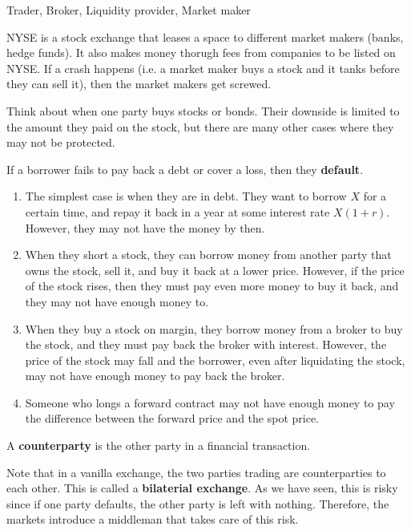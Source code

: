 \documentclass{article}
\begin{document}
    Trader, Broker, Liquidity provider, Market maker 

    NYSE is a stock exchange that leases a space to different market makers (banks, hedge funds). It also makes money thorugh fees from companies to be listed on NYSE. If a crash happens (i.e. a market maker buys a stock and it tanks before they can sell it), then the market makers get screwed. 

    Think about when one party buys stocks or bonds. Their downside is limited to the amount they paid on the stock, but there are many other cases where they may not be protected. 

    \begin{definition}[Default]
      If a borrower fails to pay back a debt or cover a loss, then they \textbf{default}. 
    \end{definition}

    \begin{example}
      \begin{enumerate}
        \item The simplest case is when they are in debt. They want to borrow $X$ for a certain time, and repay it back in a year at some interest rate $X (1 + r)$. However, they may not have the money by then. 
        \item When they short a stock, they can borrow money from another party that owns the stock, sell it, and buy it back at a lower price. However, if the price of the stock rises, then they must pay even more money to buy it back, and they may not have enough money to. 
        \item When they buy a stock on margin, they borrow money from a broker to buy the stock, and they must pay back the broker with interest. However, the price of the stock may fall and the borrower, even after liquidating the stock, may not have enough money to pay back the broker.
        \item Someone who longs a forward contract may not have enough money to pay the difference between the forward price and the spot price.
      \end{enumerate}
    \end{example}

    \begin{definition}[Counterparty]
      A \textbf{counterparty} is the other party in a financial transaction. 
    \end{definition}

    Note that in a vanilla exchange, the two parties trading are counterparties to each other. This is called a \textbf{bilaterial exchange}. As we have seen, this is risky since if one party defaults, the other party is left with nothing. Therefore, the markets introduce a middleman that takes care of this risk. 
\end{document}
